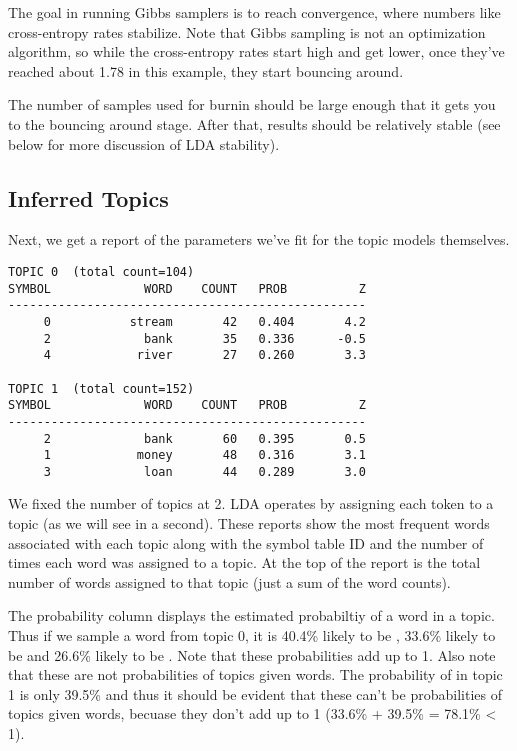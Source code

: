 The goal in running Gibbs samplers is to reach convergence, where
numbers like cross-entropy rates stabilize.  Note that Gibbs sampling
is not an optimization algorithm, so while the cross-entropy rates
start high and get lower, once they've reached about 1.78 in this
example, they start bouncing around.  

The number of samples used for burnin should be large enough that it
gets you to the bouncing around stage.  After that, results should be
relatively stable (see below for more discussion of LDA stability).

\subsection{Inferred Topics}

Next, we get a report of the parameters we've fit for the topic
models themselves.
%
\begin{verbatim}
TOPIC 0  (total count=104)
SYMBOL             WORD    COUNT   PROB          Z
--------------------------------------------------
     0           stream       42   0.404       4.2
     2             bank       35   0.336      -0.5
     4            river       27   0.260       3.3

TOPIC 1  (total count=152)
SYMBOL             WORD    COUNT   PROB          Z
--------------------------------------------------
     2             bank       60   0.395       0.5
     1            money       48   0.316       3.1
     3             loan       44   0.289       3.0
\end{verbatim}
%
We fixed the number of topics at 2.  LDA operates by assigning each
token to a topic (as we will see in a second).  These reports show the
most frequent words associated with each topic along with the symbol
table ID and the number of times each word was assigned to a topic.
At the top of the report is the total number of words assigned to that
topic (just a sum of the word counts).  

The probability column displays the estimated probabiltiy of a word in
a topic.  Thus if we sample a word from topic 0, it is 40.4\% likely
to be , 33.6\% likely to be 
and 26.6\% likely to be .  Note that these
probabilities add up to 1.  Also note that these are not probabilities
of topics given words.  The probability of  in
topic 1 is only 39.5\% and thus it should be evident that these can't
be probabilities of topics given words, becuase they don't add up to 1
(33.6\% + 39.5\% = 78.1\% < 1).

